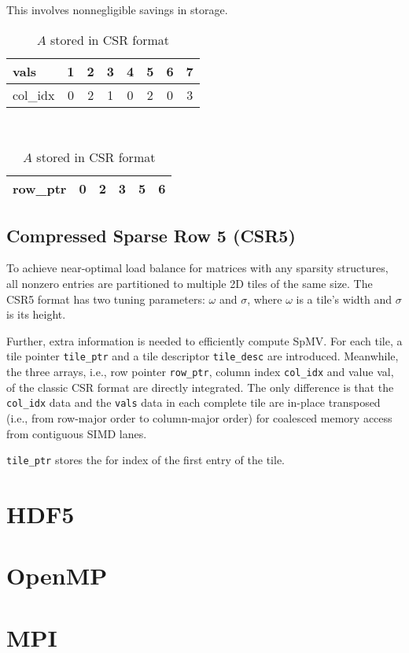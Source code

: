 \documentclass[thesis=M,english]{FITthesis}[2019/12/23]
\begin{document}
This involves nonnegligible savings in storage.

\begin{table}[h!]
	\centering
	\begin{tabular}{ |l||c|c|c|c|c|c|c| }
		\hline
		vals     & 1 & 2 & 3 & 4 & 5 & 6 & 7 \\
		\hline
		col\_idx & 0 & 2 & 1 & 0 & 2 & 0 & 3 \\
		\hline
	\end{tabular} \\
	\begin{tabular}{ |l||c|c|c|c|c| }
		\hline
		row\_ptr & 0 & 2 & 3 & 5 & 6 \\
		\hline
	\end{tabular}
	\caption{$A$ stored in CSR format}
\end{table}

\section{Compressed Sparse Row 5 (CSR5)}

To achieve near-optimal load balance for matrices with any sparsity structures,
all nonzero entries are partitioned to multiple 2D tiles of the same size.
The CSR5 format has two tuning parameters: $\omega$ and $\sigma$, where $\omega$
is a tile’s width and $\sigma$ is its height. \cite{liu2015csr5}

Further, extra information is needed to efficiently compute
SpMV. For each tile, a tile pointer \lstinline!tile_ptr! and a tile descriptor \lstinline!tile_desc! are introduced.
Meanwhile, the three arrays, i.e., row pointer \lstinline!row_ptr!, column index \lstinline!col_idx! and value val,
of the classic CSR format are directly integrated. The only difference is that the \lstinline!col_idx! data and the \lstinline!vals!
data in each complete tile are in-place transposed (i.e., from row-major order to column-major order) for coalesced memory access from contiguous SIMD lanes.

\lstinline!tile_ptr! stores the for index of the first entry of the tile.

\chapter{HDF5}
\chapter{OpenMP}
\chapter{MPI}
\end{document}

